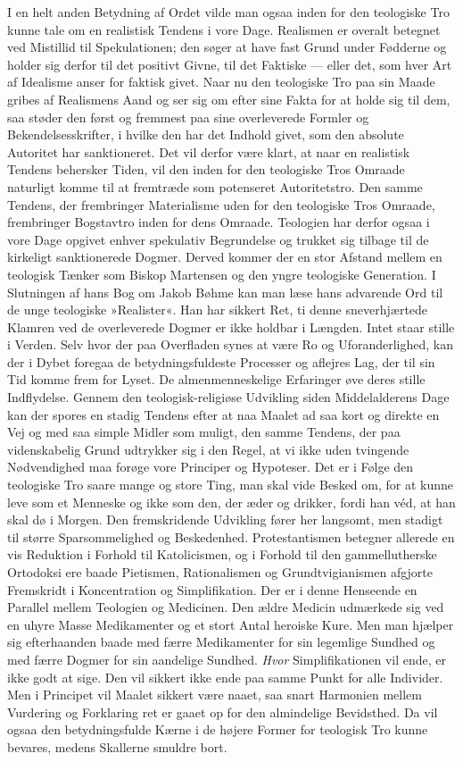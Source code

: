 \documentclass[12pt,a4paper]{article}
\newcommand{\opage}[1]{\marginnote{\footnotesize\textit{[#1]}}}
\begin{document}
I en helt anden Betydning af Ordet vilde man ogsaa inden for den
teologiske Tro kunne tale om en realistisk Tendens i vore Dage.
Realismen er overalt betegnet ved Mistillid til Spekulationen; den søger
at have fast Grund under Fødderne og holder sig derfor til det positivt
Givne, til det Faktiske --- eller det, som hver Art af Idealisme anser
for faktisk givet. Naar nu den teologiske Tro paa sin Maade gribes af
Realismens Aand og ser sig om efter sine Fakta for at holde sig til
dem, saa støder den først og fremmest paa sine overleverede Formler og
Bekendelsesskrifter, i hvilke den har det Indhold givet, som den
absolute Autoritet har sanktioneret. Det vil derfor være klart, at naar
en realistisk Tendens behersker Tiden, vil den inden for den teologiske
Tros Omraade naturligt komme til at fremtræde som potenseret
Autoritetstro. Den samme Tendens, der frembringer Materialisme uden for
den teologiske Tros Omraade, frembringer Bogstavtro inden for dens
Omraade. Teologien har derfor ogsaa i vore Dage opgivet enhver spekulativ
Begrundelse og trukket sig tilbage til de kirkeligt sanktionerede Dogmer.
\opage{13}Derved kommer der en stor Afstand mellem en teologisk Tænker som Biskop
Martensen og den yngre teologiske Generation. I Slutningen af hans Bog
om Jakob Bøhme kan man læse hans advarende Ord til de unge teologiske
»Realister«. Han har sikkert Ret, ti denne sneverhjærtede Klamren ved de
overleverede Dogmer er ikke holdbar i Længden. Intet staar stille i
Verden. Selv hvor der paa Overfladen synes at være Ro og
Uforanderlighed, kan der i Dybet foregaa de betydningsfuldeste Processer
og aflejres Lag, der til sin Tid komme frem for Lyset. De
almenmenneskelige Erfaringer øve deres stille Indflydelse. Gennem den
teologisk-religiøse Udvikling siden Middelalderens Dage kan der spores
en stadig Tendens efter at naa Maalet ad saa kort og direkte en Vej og
med saa simple Midler som muligt, den samme Tendens, der paa
videnskabelig Grund udtrykker sig i den Regel, at vi ikke uden tvingende
Nødvendighed maa forøge vore Principer og Hypoteser. Det er i Følge den
teologiske Tro saare mange og store Ting, man skal vide Besked om, for
at kunne leve som et Menneske og ikke som den, der æder og drikker,
fordi han véd, at han skal dø i Morgen. Den fremskridende Udvikling
fører her langsomt, men stadigt til større Sparsommelighed og
Beskedenhed. Protestantismen betegner allerede en vis Reduktion i Forhold
til Katolicismen, og i Forhold til den gammellutherske Ortodoksi ere
baade Pietismen, Rationalismen og Grundtvigianismen afgjorte Fremskridt
i Koncentration og Simplifikation. Der er i denne Henseende en Parallel
mellem Teologien og Medicinen. Den ældre Medicin udmærkede sig ved en
uhyre Masse Medikamenter og et stort Antal heroiske Kure. Men man
hjælper sig efterhaanden baade med færre Medikamenter for sin legemlige
Sundhed og med færre Dogmer for sin aandelige Sundhed. \emph{Hvor}
Simplifikationen vil ende, er ikke godt at sige. Den vil sikkert ikke
ende paa samme Punkt for alle Individer. Men i Principet vil Maalet
sikkert være naaet, saa snart Harmonien mellem Vurdering og Forklaring
ret er gaaet op for den almindelige Bevidsthed. Da vil ogsaa den
betydningsfulde Kærne i de højere Former for teologisk Tro kunne
bevares,
\opage{14}medens Skallerne smuldre bort.
\end{document}
